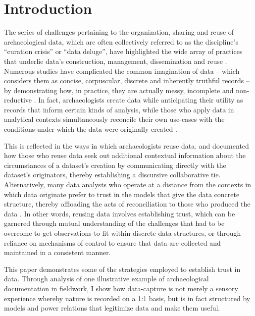 \documentclass[
]{article}
\author{}
\date{}
\begin{document}
\section{Introduction}\label{introduction}

The series of challenges pertaining to the organization, sharing and
reuse of archaeological data, which are often collectively referred to
as the discipline's ``curation crisis'' or ``data deluge'', have
highlighted the wide array of practices that underlie data's
construction, management, dissemination and reuse
\autocite{bevan2012a,huggett2022,huggett2022a}. Numerous studies have
complicated the common imagination of data -- which considers them as
concise, corpuscular, discrete and inherently truthful records -- by
demonstrating how, in practice, they are actually messy, incomplete and
non-reductive
\autocites[cf.][]{batist2024a,dallas2015,huggett2022a,voss2012}. In
fact, archaeologists create data while anticipating their utility as
records that inform certain kinds of analysis, while those who apply
data in analytical contexts simultaneously reconcile their own use-cases
with the conditions under which the data were originally created
\autocite[190-191]{dallas2015}.

This is reflected in the ways in which archaeologists reuse data.
\textcite{faniel2013} and \textcite{atici2013} documented how those who
reuse data seek out additional contextual information about the
circumstances of a dataset's creation by communicating directly with the
dataset's originators, thereby establishing a discursive collaborative
tie. Alternatively, many data analysts who operate at a distance from
the contexts in which data originate prefer to trust in the models that
give the data concrete structure, thereby offloading the acts of
reconciliation to those who produced the data \autocite{huggett2022}. In
other words, reusing data involves establishing trust, which can be
garnered through mutual understanding of the challenges that had to be
overcome to get observations to fit within discrete data structures, or
through reliance on mechanisms of control to ensure that data are
collected and maintained in a consistent manner.

This paper demonstrates some of the strategies employed to establish
trust in data. Through analysis of one illustrative example of
archaeological documentation in fieldwork, I show how data-capture is
not merely a sensory experience whereby nature is recorded on a 1:1
basis, but is in fact structured by models and power relations that
legitimize data and make them useful.

\printbibliography
\end{document}
